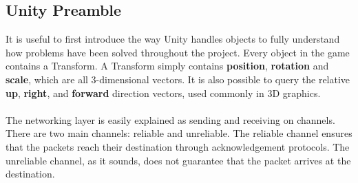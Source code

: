 \documentclass[11pt,a4paper]{article}
\begin{document}
 \subsection{Unity Preamble}
 It is useful to first introduce the way Unity handles objects to fully understand how problems have been solved throughout the project. 
 Every object in the game contains a Transform. A Transform simply contains \textbf{position}, \textbf{rotation} and \textbf{scale}, which are all 3-dimensional vectors. It is also possible to query the relative \textbf{up}, \textbf{right}, and \textbf{forward} direction vectors, used commonly in 3D graphics. \\ \\
\noindent
 The networking layer is easily explained as sending and receiving on channels. There are two main channels: reliable and unreliable. The reliable channel ensures that the packets reach their destination through acknowledgement protocols. The unreliable channel, as it sounds, does not guarantee that the packet arrives at the destination.
 
\end{document}

